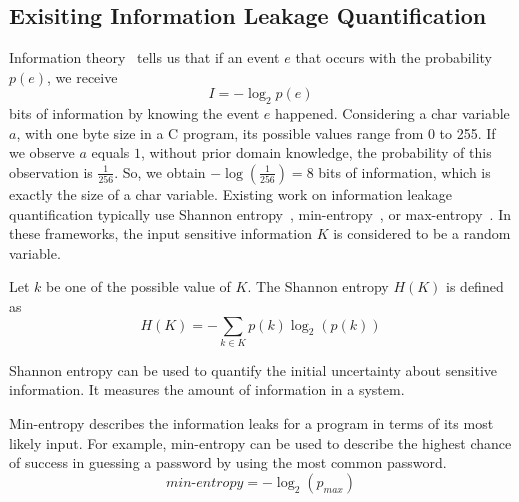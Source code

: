 


\subsection{Exisiting Information Leakage Quantification}\label{sec:background_leak}

Information theory~\cite{shannon1948mathematical} tells us that if an event $e$ that occurs with the probability $p(e)$, we receive
\begin{displaymath}
    I = - \log_2p(e)
\end{displaymath}
bits of information by knowing the event $e$ happened. 
Considering a char variable $a$,
with one byte size in a C program, its possible values range from 0 to 255.
If we observe $a$ equals $1$, without prior domain knowledge, 
the probability of this observation is $\frac{1}{256}$. 
So, we obtain  $-\log(\frac{1}{256}) = 8$ bits of information, which is exactly the size
of a char variable.
Existing work on information leakage quantification typically use Shannon
entropy~\cite{clark2007static,Wichelmann:2018:MFF:3274694.3274741},
min-entropy~\cite{10.1007/978-3-642-00596-1_21}, or max-entropy~\cite{182946,
Doychev:2017:RAS:3062341.3062388}. In these frameworks, the input sensitive
information $K$ is considered to be a random variable.

Let $k$ be one of the possible
value of $K$. The Shannon entropy $H(K)$ is defined as
\begin{displaymath}
    H(K) = - \sum_{k {\in} K}p(k)\log_2(p(k))
\end{displaymath}

Shannon entropy can be used to quantify the initial uncertainty about
sensitive information. It measures the amount of information in a system.

Min-entropy describes the information leaks for a program in terms of its most likely input. 
For example, min-entropy can be used to describe the
highest chance of success in guessing a password by using the
most common password. %
\begin{displaymath}
    \mathit{min\text{-}entropy} = - \log_2(p_{\mathit{max}})
\end{displaymath}

